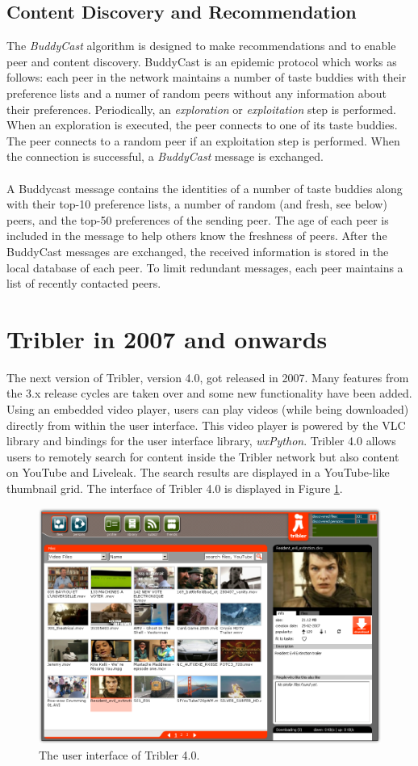 \subsection{Content Discovery and Recommendation}
The \emph{BuddyCast} algorithm is designed to make recommendations and to enable peer and content discovery. BuddyCast is an epidemic protocol which works as follows: each peer in the network maintains a number of taste buddies with their preference lists and a numer of random peers without any information about their preferences. Periodically, an \emph{exploration} or \emph{exploitation} step is performed. When an exploration is executed, the peer connects to one of its taste buddies. The peer connects to a random peer if an exploitation step is performed. When the connection is successful, a \emph{BuddyCast} message is exchanged.\\\\
A Buddycast message contains the identities of a number of taste buddies along with their top-10 preference lists, a number of random (and fresh, see below) peers, and the top-50 preferences of the sending peer. The age of each peer is included in the message to help others know the freshness of peers. After the BuddyCast messages are exchanged, the received information is stored in the local database of each peer. To limit redundant messages, each peer maintains a list of recently contacted peers.

\section{Tribler in 2007 and onwards}
The next version of Tribler, version 4.0, got released in 2007\cite{tribler4tf}. Many features from the 3.x release cycles are taken over and some new functionality have been added. Using an embedded video player, users can play videos (while being downloaded) directly from within the user interface. This video player is powered by the VLC library and bindings for the user interface library, \emph{wxPython}. Tribler 4.0 allows users to remotely search for content inside the Tribler network but also content on YouTube and Liveleak. The search results are displayed in a YouTube-like thumbnail grid. The interface of Tribler 4.0 is displayed in Figure \ref{fig:tribler4}.

\begin{figure}[t]
	\centering
	\includegraphics[width=0.8\columnwidth]{images/tribler4}
	\caption{The user interface of Tribler 4.0.}
	\label{fig:tribler4}
\end{figure}

